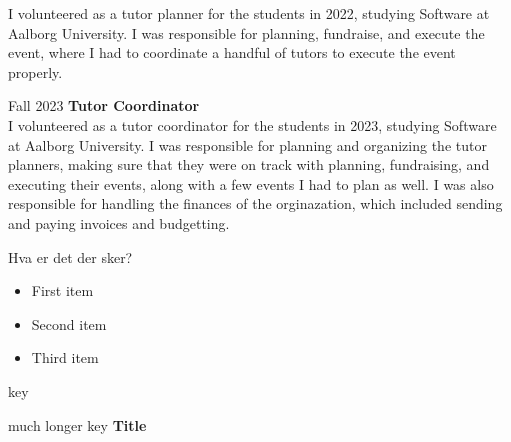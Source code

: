 \begin{cv}
    I volunteered as a tutor planner for the students in 2022, studying Software at Aalborg University.
    I was responsible for planning, fundraise, and execute the event, where I had to coordinate a handful of tutors to execute the event properly.
\item[Fall 2023] \textbf{Tutor Coordinator}\\
    I volunteered as a tutor coordinator for the students in 2023, studying Software at Aalborg University.
    I was responsible for planning and organizing the tutor planners, making sure that they were on track with planning, fundraising, and executing their events, along with a few events I had to plan as well.
    I was also responsible for handling the finances of the orginazation, which included sending and paying invoices and budgetting.
\end{cv}
\showsep Hva er det der sker? %


\begin{itemize}[label=\textbar, left=0pt]
    \item First item
    \item Second item
    \item Third item
\end{itemize}
\begin{cv}
\item[key] \lipsum[1-3]
\item[much longer key] \textbf{Title}\\\lipsum[1-10]
\end{cv}
\fi


